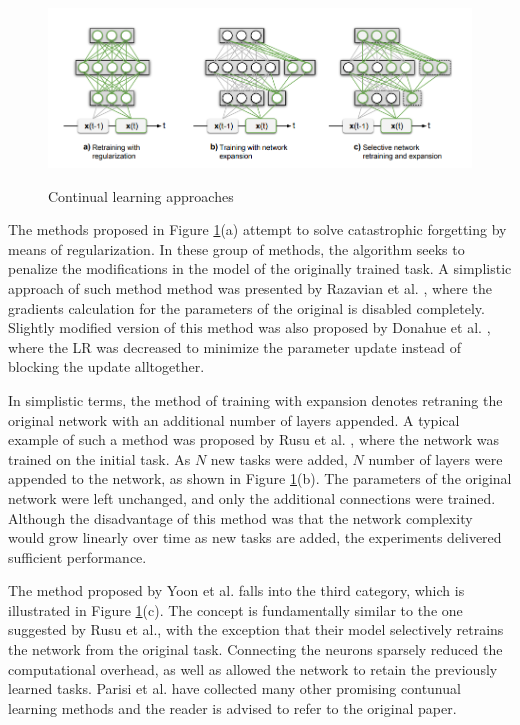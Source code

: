 \documentclass[english, 12pt, a4paper, elec, utf8, a-1b, online]{aaltothesis}
\begin{document}
\begin{figure}[htb]
	\begin{center}
		\includegraphics[width=16cm]{./continual.png}
	\end{center}
	\caption{Continual learning approaches
\cite{Parisi2018}}
	\begin{center}
		\label{continual}
	\end{center}
\end{figure}
\FloatBarrier

The methods proposed in Figure \ref{continual}(a) attempt to solve catastrophic forgetting by means of regularization. In these group of methods, the algorithm seeks to penalize the modifications in the model of the originally trained task. A simplistic approach of such method method was presented by Razavian et al. \cite{Razavian2014}, where the gradients calculation for the parameters of the original is disabled completely. Slightly modified version of this method was also proposed by Donahue et al. \cite{Donahue2013}, where the LR was decreased to minimize the parameter update instead of blocking the update alltogether. 


In simplistic terms, the method of training with expansion denotes retraning the original network with an additional number of layers appended. A typical example of such a method was proposed by Rusu et al. \cite{Rusu2016}, where the network was trained on the initial task. As $N$ new tasks were added, $N$ number of layers were appended to the network, as shown in Figure \ref{continual}(b). The parameters of the original network were left unchanged, and only the additional connections were trained. Although the disadvantage of this method was that the network complexity would grow linearly over time as new tasks are added, the experiments delivered sufficient performance. 

The method proposed by Yoon et al. \cite{Yoon2017} falls into the third category, which is illustrated in Figure \ref{continual}(c). The concept is fundamentally similar to the one suggested by Rusu et al.\cite{Rusu2016}, with the exception that their model selectively retrains the network from the original task. Connecting the neurons sparsely reduced the computational overhead, as well as allowed the network to retain the previously learned tasks. Parisi et al. have collected many other promising contunual learning methods and the reader is advised to refer to the original paper.   
\end{document}
